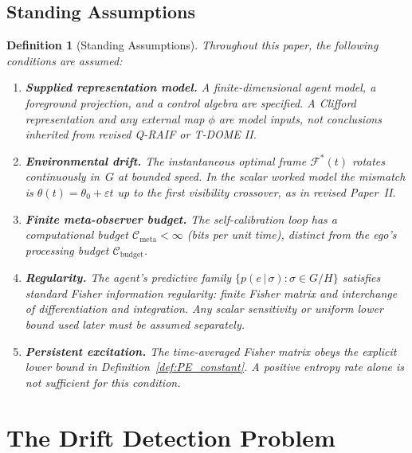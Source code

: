 \documentclass[12pt]{article}
\newtheorem{definition}[theorem]{Definition}
\begin{document}
\subsection{Standing Assumptions}
\label{subsec:standing_C}

\begin{definition}[Standing Assumptions]
\label{def:assumptions_C}
Throughout this paper, the following conditions are assumed:
\begin{enumerate}
\item[\textup{(C1)}] \textbf{Supplied representation model.}
  A finite-dimensional agent model, a foreground projection, and a
  control algebra are specified.  A Clifford representation and any
  external map $\phi$ are model inputs, not conclusions inherited from
  revised Q-RAIF or T-DOME II.
\item[\textup{(C2)}] \textbf{Environmental drift.}
  The instantaneous optimal frame
  $\mathcal{F}^*(t)$ rotates continuously in~$G$ at
  bounded speed.  In the scalar worked model the mismatch is
  $\theta(t)=\theta_0+\varepsilon t$ up to the first visibility
  crossover, as in revised Paper~II.
\item[\textup{(C3)}] \textbf{Finite meta-observer budget.}
  The self-calibration loop has a computational budget
  $\mathcal{C}_{\mathrm{meta}} < \infty$ (bits per unit
  time), distinct from the ego's processing budget
  $\mathcal{C}_{\mathrm{budget}}$.
\item[\textup{(C4)}] \textbf{Regularity.}
  The agent's predictive family
  $\{p(e\,|\,\sigma)
  : \sigma \in G/H\}$ satisfies standard Fisher
  information regularity: finite Fisher matrix and interchange of
  differentiation and integration.  Any scalar sensitivity or uniform
  lower bound used later must be assumed separately.
\item[\textup{(C5)}] \textbf{Persistent excitation.}
  The time-averaged Fisher matrix obeys the explicit lower bound in
  Definition~\ref{def:PE_constant}.  A positive entropy rate alone is
  not sufficient for this condition.
\end{enumerate}
\end{definition}

\section{The Drift Detection Problem}
\label{sec:detection}

\end{document}
